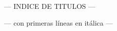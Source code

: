 \pagestyle{fancy}

       \chead{\CHeadFont ({\rm\thepage})}
       \rhead{\RHeadFont\RelDate}


\renewcommand{\item}{\par\hangindent=40pt}
\renewcommand{\subitem}{\par\hangindent=40pt \hspace*{20pt}}
\renewcommand{\subsubitem}{\par\hangindent=40pt \hspace*{30pt}}


%

{\parindent 8pt
  {\myTitleFont --- INDICE DE TITULOS ---}}\par
\vskip 5pt
{\parindent 20pt
  {\mySubTitleFont --- con primeras l\'ineas en it\'alica ---}}
\vskip 20pt



%
%
